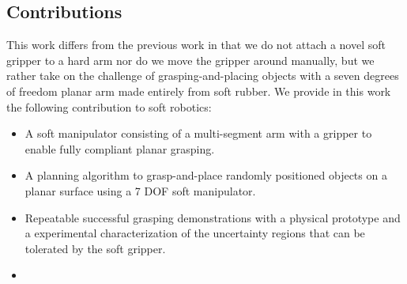 \subsection{Contributions}
This work differs from the previous work in that we  do not attach a novel soft gripper to a hard arm nor do we move the gripper around manually, but we rather take on the challenge of grasping-and-placing objects with a seven degrees of freedom planar arm made entirely from soft rubber. 
We provide in this work the following contribution to soft robotics:
\begin{itemize}
  \item A  soft manipulator consisting of a multi-segment arm with a gripper to enable fully compliant planar grasping.
  \item A planning algorithm to grasp-and-place randomly positioned objects on a planar surface using a 7 DOF soft manipulator.  
  \item Repeatable successful grasping demonstrations with a physical prototype and a  experimental characterization of the uncertainty regions that can be tolerated by the soft gripper.
  \item {} 
\end{itemize}


